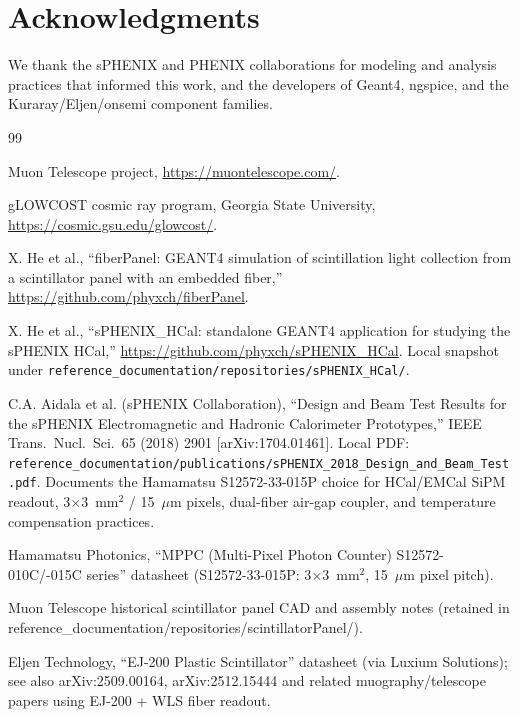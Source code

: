 \documentclass[11pt,a4paper]{article}
\begin{document}
\section*{Acknowledgments}
We thank the sPHENIX and PHENIX collaborations for modeling and analysis practices that informed this work, and the developers of Geant4, ngspice, and the Kuraray/Eljen/onsemi component families.


\begin{thebibliography}{99}

Muon Telescope project, \url{https://muontelescope.com/}.

gLOWCOST cosmic ray program, Georgia State University, \url{https://cosmic.gsu.edu/glowcost/}.

X. He et al., ``fiberPanel: GEANT4 simulation of scintillation light collection from a scintillator panel with an embedded fiber,'' \url{https://github.com/phyxch/fiberPanel}.

X. He et al., ``sPHENIX\_HCal: standalone GEANT4 application for studying the sPHENIX HCal,'' \url{https://github.com/phyxch/sPHENIX_HCal}. Local snapshot under \texttt{reference\_documentation/repositories/sPHENIX\_HCal/}.

C.A. Aidala et al. (sPHENIX Collaboration), ``Design and Beam Test Results for the sPHENIX Electromagnetic and Hadronic Calorimeter Prototypes,'' IEEE Trans.\ Nucl.\ Sci.\ 65 (2018) 2901 [arXiv:1704.01461]. Local PDF: \texttt{reference\_documentation/publications/sPHENIX\_2018\_Design\_and\_Beam\_Test.pdf}. Documents the Hamamatsu S12572-33-015P choice for HCal/EMCal SiPM readout, 3$\times$3~mm$^2$ / 15~$\mu$m pixels, dual-fiber air-gap coupler, and temperature compensation practices.

Hamamatsu Photonics, ``MPPC (Multi-Pixel Photon Counter) S12572-010C/-015C series'' datasheet (S12572-33-015P: 3$\times$3~mm$^2$, 15~$\mu$m pixel pitch).

Muon Telescope historical scintillator panel CAD and assembly notes (retained in reference\_documentation/repositories/scintillatorPanel/).

Eljen Technology, ``EJ-200 Plastic Scintillator'' datasheet (via Luxium Solutions); see also arXiv:2509.00164, arXiv:2512.15444 and related muography/telescope papers using EJ-200 + WLS fiber readout.


\end{thebibliography}
\end{document}
